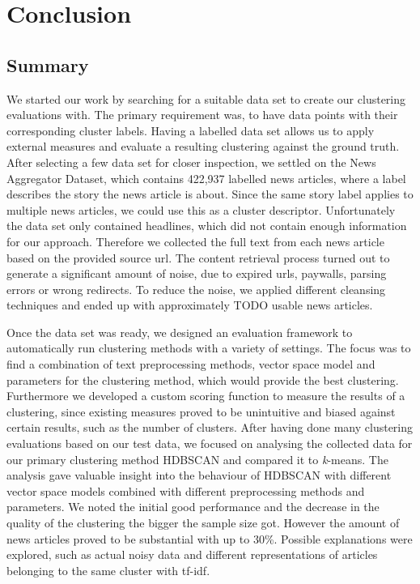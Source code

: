 \section{Conclusion}
\label{sec:6_conclusion}

\subsection{Summary}
\label{subsec:6_summary}

We started our work by searching for a suitable data set to create our clustering evaluations with.
The primary requirement was, to have data points with their corresponding cluster labels.
Having a labelled data set allows us to apply external measures
and evaluate a resulting clustering against the ground truth.
After selecting a few data set for closer inspection, we settled on the News Aggregator Dataset,
which contains 422,937 labelled news articles, where a label describes the story the news article is about.
Since the same story label applies to multiple news articles, we could use this as a cluster descriptor.
Unfortunately the data set only contained headlines, which did not contain enough information for our approach.
Therefore we collected the full text from each news article based on the provided source url.
The content retrieval process turned out to generate a significant amount of noise,
due to expired urls, paywalls, parsing errors or wrong redirects.
To reduce the noise, we applied different cleansing techniques
and ended up with approximately TODO usable news articles.

Once the data set was ready, we designed an evaluation framework to automatically run clustering methods
with a variety of settings.
The focus was to find a combination of text preprocessing methods,
vector space model and parameters for the clustering method, which would provide the best clustering.
Furthermore we developed a custom scoring function to measure the results of a clustering,
since existing measures proved to be unintuitive and biased against certain results,
such as the number of clusters.
After having done many clustering evaluations based on our test data,
we focused on analysing the collected data for our primary clustering method HDBSCAN
and compared it to \textit{k}-means.
The analysis gave valuable insight into the behaviour of HDBSCAN with different vector space models
combined with different preprocessing methods and parameters.
We noted the initial good performance and the decrease in the quality of the clustering the bigger the sample size got.
However the amount of news articles proved to be substantial with up to 30\%.
Possible explanations were explored,
such as actual noisy data and different representations of articles belonging to the same cluster with tf-idf.

